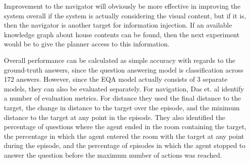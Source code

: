 \documentclass{article}
\begin{document}
Improvement to the navigator will obviously be more effective in improving the system overall if the system is actually considering the visual content, but if it is, then the navigator is another target for information injection. If an available knowledge graph about house contents can be found, then the next experiment would be to give the planner access to this information. 

Overall performance can be calculated as simple accuracy with regards to the ground-truth answers, since the question answering model is classification across 172 answers. However, since the EQA model actually consists of 3 separate models, they can also be evaluated separately. For navigation, Das et. al identify a number of evaluation metrics. For distance they used the final distance to the target, the change in distance to the target over the episode, and the minimum distance to the target at any point in the episode. They also identified the percentage of questions %
where the agent ended in the room containing the target, the percentage in which the agent entered the room with the target at any point during the episode, and the percentage of episodes in which the agent stopped to answer the question before the maximum number of actions was reached. 




\end{document}
